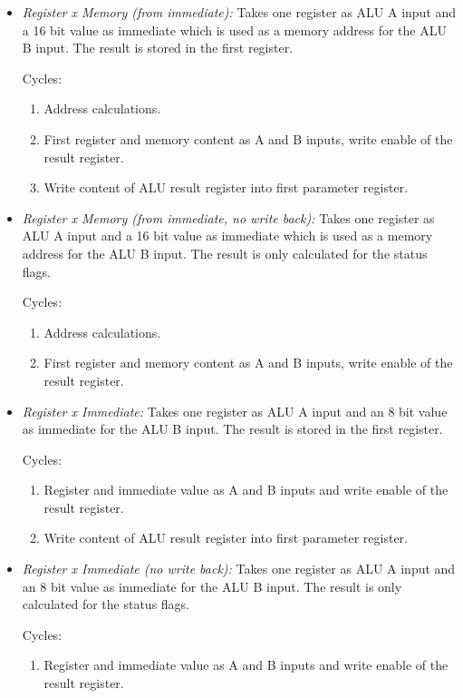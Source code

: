 \begin{itemize}
  \item \emph{Register x Memory (from immediate):} Takes one register as \gls{ALU} A input and a 16 bit value as immediate which is used as a memory address for the \gls{ALU} B input.
  The result is stored in the first register.

  Cycles:
  \begin{enumerate}
    \item Address calculations.
    \item First register and memory content as A and B inputs, write enable of the result register.
    \item Write content of \gls{ALU} result register into first parameter register.
  \end{enumerate}

  \item \emph{Register x Memory (from immediate, no write back):} Takes one register as \gls{ALU} A input and a 16 bit value as immediate which is used as a memory address for the \gls{ALU} B input.
  The result is only calculated for the status flags.

  Cycles:
  \begin{enumerate}
    \item Address calculations.
    \item First register and memory content as A and B inputs, write enable of the result register.
  \end{enumerate}

  \item \emph{Register x Immediate:} Takes one register as \gls{ALU} A input and an 8 bit value as immediate  for the \gls{ALU} B input.
  The result is stored in the first register.

  Cycles:
  \begin{enumerate}
    \item Register and immediate value as A and B inputs and write enable of the result register.
    \item Write content of \gls{ALU} result register into first parameter register.
  \end{enumerate}

  \item \emph{Register x Immediate (no write back):} Takes one register as \gls{ALU} A input and an 8 bit value as immediate  for the \gls{ALU} B input.
  The result is only calculated for the status flags.

  Cycles:
  \begin{enumerate}
    \item Register and immediate value as A and B inputs and write enable of the result register.
  \end{enumerate}
\end{itemize}

